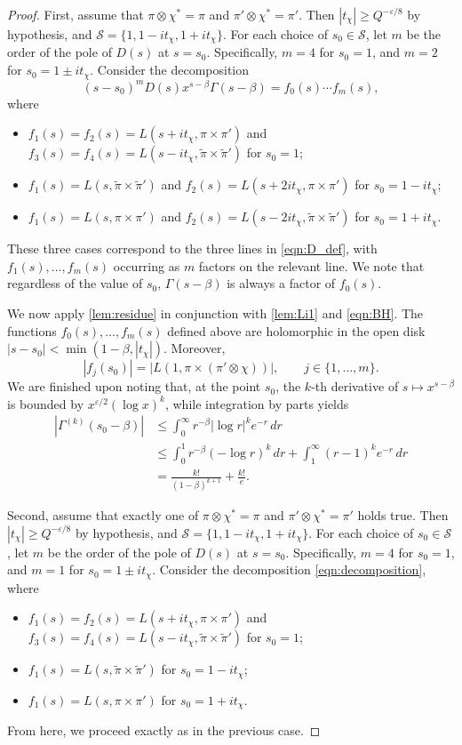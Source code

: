 \documentclass[12pt]{amsart}
\theoremstyle{definition}
\theoremstyle{remark}
\numberwithin{equation}{section}
\theoremstyle{plain}
\renewcommand{\tilde}{\widetilde}
\renewcommand{\epsilon}{\varepsilon}
\begin{document}
\begin{proof}
First, assume that $\pi\otimes\chi^*=\pi$ and $\pi'\otimes\chi^*=\pi'$. Then $|t_{\chi}|\geq Q^{-\epsilon/8}$ by hypothesis, and $\mathcal{S}=\{1,1-it_\chi,1+it_\chi\}$. For each choice of $s_0\in\mathcal{S}$, let $m$ be the order of the pole of $D(s)$ at $s=s_0$. Specifically, $m=4$ for $s_0=1$, and $m=2$ for $s_0=1\pm it_\chi$. Consider the decomposition
\begin{equation}
\label{eqn:decomposition}
(s-s_0)^m D(s)x^{s-\beta}\Gamma(s-\beta)=f_0(s)\dotsb f_m(s),
\end{equation}
where
\begin{itemize}
\item $f_1(s)=f_2(s)=L(s+it_\chi,\pi\times\pi')$ and $f_3(s)=f_4(s)=L(s-it_\chi,\tilde{\pi}\times\tilde{\pi}')$ for $s_0=1$;
\item $f_1(s)=L(s,\tilde\pi\times\tilde\pi')$ and $f_2(s)=L(s+2it_\chi,\pi\times\pi')$ for $s_0=1-it_\chi$;
\item $f_1(s)=L(s,\pi\times\pi')$ and $f_2(s)=L(s-2it_\chi,\tilde{\pi}\times\tilde{\pi}')$ for $s_0=1+it_\chi$.
\end{itemize}
These three cases correspond to the three lines in \eqref{eqn:D_def}, with $f_1(s),\dotsc,f_{m}(s)$ occurring as $m$ factors on the relevant line.  We note that regardless of the value of $s_0$, $\Gamma(s-\beta)$ is always a factor of $f_0(s)$.

We now apply \cref{lem:residue} in conjunction with \cref{lem:Li1} and \eqref{eqn:BH}. The functions $f_0(s),\dotsc,f_m(s)$ defined above are holomorphic in the open disk $|s-s_0|<\min(1-\beta,|t_\chi|)$. Moreover,
\[
|f_j(s_0)|=|L(1,\pi\times(\pi'\otimes\chi))|,\qquad j\in\{1,\dots,m\}.
\]
We are finished upon noting that, at the point $s_0$, the $k$-th derivative of $s\mapsto x^{s-\beta}$ is bounded by $x^{\epsilon/2}(\log x)^k$, while integration by parts yields
\begin{align*}
\left|\Gamma^{(k)}(s_0-\beta)\right|
&\leq\int_0^\infty r^{-\beta}|\log r|^k e^{-r}\,dr\\
&\leq\int_0^1 r^{-\beta}(-\log r)^k\,dr+\int_1^\infty(r-1)^k e^{-r}\,dr\\
&=\frac{k!}{(1-\beta)^{k+1}}+\frac{k!}{e}.
\end{align*}

Second, assume that exactly one of $\pi\otimes\chi^*=\pi$ and $\pi'\otimes\chi^*=\pi'$ holds true. Then $|t_{\chi}|\geq Q^{-\epsilon/8}$ by hypothesis, and $\mathcal{S}=\{1,1-it_\chi,1+it_\chi\}$. For each choice of $s_0\in\mathcal{S}$, let $m$ be the order of the pole of $D(s)$ at $s=s_0$. Specifically, $m=4$ for $s_0=1$, and $m=1$ for $s_0=1\pm it_\chi$. Consider the decomposition \eqref{eqn:decomposition}, where
\begin{itemize}
\item $f_1(s)=f_2(s)=L(s+it_\chi,\pi\times\pi')$ and $f_3(s)=f_4(s)=L(s-it_\chi,\tilde{\pi}\times\tilde{\pi}')$ for $s_0=1$;
\item $f_1(s)=L(s,\tilde\pi\times\tilde\pi')$ for $s_0=1-it_\chi$;
\item $f_1(s)=L(s,\pi\times\pi')$ for $s_0=1+it_\chi$.
\end{itemize}
From here, we proceed exactly as in the previous case.


\end{proof}
\end{document}
